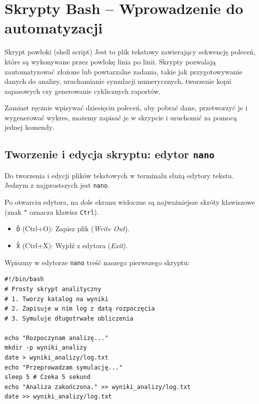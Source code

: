 \section{Skrypty Bash – Wprowadzenie do automatyzacji}
\begin{definitionbox}{Skrypt powłoki (shell script)}
Jest to plik tekstowy zawierający sekwencję poleceń, które są wykonywane przez powłokę linia po linii. Skrypty pozwalają zautomatyzować złożone lub powtarzalne zadania, takie jak przygotowywanie danych do analizy, uruchamianie symulacji numerycznych, tworzenie kopii zapasowych czy generowanie cyklicznych raportów.
\end{definitionbox}

Zamiast ręcznie wpisywać dziesięciu poleceń, aby pobrać dane, przetworzyć je i wygenerować wykres, możemy zapisać je w skrypcie i uruchomić za pomocą jednej komendy.

\subsection{Tworzenie i edycja skryptu: edytor \texttt{nano}}
Do tworzenia i edycji plików tekstowych w terminalu służą edytory tekstu. Jednym z najprostszych jest \texttt{nano}.
Po otwarciu edytora, na dole ekranu widoczne są najważniejsze skróty klawiszowe (znak \texttt{\^} oznacza klawisz \texttt{Ctrl}).
\begin{itemize}
    \item \texttt{\^O} (Ctrl+O): Zapisz plik (\textit{Write Out}).
    \item \texttt{\^X} (Ctrl+X): Wyjdź z edytora (\textit{Exit}).
\end{itemize}

Wpiszmy w edytorze \texttt{nano} treść naszego pierwszego skryptu:
\begin{verbatim}
#!/bin/bash
# Prosty skrypt analityczny
# 1. Tworzy katalog na wyniki
# 2. Zapisuje w nim log z datą rozpoczęcia
# 3. Symuluje długotrwałe obliczenia

echo "Rozpoczynam analizę..."
mkdir -p wyniki_analizy
date > wyniki_analizy/log.txt
echo "Przeprowadzam symulację..."
sleep 5 # Czeka 5 sekund
echo "Analiza zakończona." >> wyniki_analizy/log.txt
date >> wyniki_analizy/log.txt
\end{verbatim}

